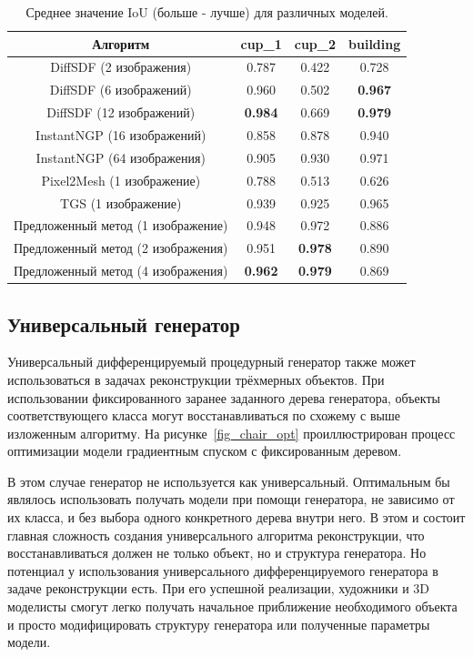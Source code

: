 \documentclass[a4paper,hidelinks,12pt]{article}
\begin{document}
\begin{table}[H] 
	\begin{tabularx}{\textwidth}{cccc}
		\toprule
		\textbf{Алгоритм}	& \textbf{cup\_1}	& \textbf{cup\_2} & \textbf{building}\\
		\midrule
		DiffSDF (2 изображения) 		& 0.787 & 0.422 & 0.728\\
		DiffSDF (6 изображений) 		& 0.960 & 0.502 & \textbf{0.967}\\
		DiffSDF (12 изображений) 		& \textbf{0.984} & 0.669 & \textbf{0.979}\\
		InstantNGP (16 изображений) 	& 0.858 & 0.878 & 0.940\\
		InstantNGP (64 изображения) 	& 0.905 & 0.930 & 0.971\\
		Pixel2Mesh (1 изображение)     & 0.788 & 0.513 & 0.626\\
		TGS (1 изображение)        	& 0.939 & 0.925 & 0.965\\
		Предложенный метод (1 изображение)	& 0.948 & 0.972 & 0.886\\
		Предложенный метод (2 изображения)	& 0.951 & \textbf{0.978} & 0.890\\
		Предложенный метод (4 изображения)	& \textbf{0.962} & \textbf{0.979} & 0.869\\
		\bottomrule
	\end{tabularx}
 \caption{Среднее значение IoU (больше - лучше) для различных моделей.}\label{res_table}
\end{table}

\subsection{Универсальный генератор}
Универсальный дифференцируемый процедурный генератор также может использоваться в задачах реконструкции трёхмерных объектов. При использовании фиксированного заранее заданного дерева генератора, объекты соответствующего класса могут восстанавливаться по схожему с выше изложенным алгоритму. На рисунке~\ref{fig_chair_opt} проиллюстрирован процесс оптимизации модели градиентным спуском с фиксированным деревом.
\par
В этом случае генератор не используется как универсальный. Оптимальным бы являлось использовать получать модели при помощи генератора, не зависимо от их класса, и без выбора одного конкретного дерева внутри него. В этом и состоит главная сложность создания универсального алгоритма реконструкции, что восстанавливаться должен не только объект, но и структура генератора. Но потенциал у использования универсального дифференцируемого генератора в задаче реконструкции есть. При его успешной реализации, художники и 3D моделисты смогут легко получать начальное приближение необходимого объекта и просто модифицировать структуру генератора или полученные параметры модели.
\par
\end{document}
